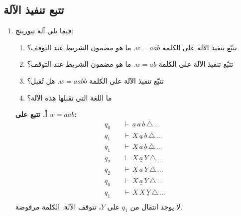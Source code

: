 \documentclass[14pt]{extarticle}
\begin{document}
\begin{enumerate}[itemsep=4em]
\section{تتبع تنفيذ الآلة}

\ifwithsols
\begin{enumerate}[itemsep=4em]
\else
\begin{enumerate}[itemsep=2em]
\fi

\item
فيما يلي آلة تيورينج:

\begin{center}
\end{center}

\begin{enumerate}
    \item تتبّع تنفيذ الآلة على الكلمة $w = aab$. ما هو مضمون الشريط عند التوقف؟
    \item تتبّع تنفيذ الآلة على الكلمة $w = ab$. ما هو مضمون الشريط عند التوقف؟
    \item تتبّع تنفيذ الآلة على الكلمة $w = aabb$. هل تُقبل؟
    \item ما اللغة التي تقبلها هذه الآلة؟
\end{enumerate}

\ifwithsols
\begin{boxSolution}

\textbf{أ. تتبع على $w = aab$:}
\begin{align*}
q_0 \quad &\vdash \, \underline{a} \, a \, b \, \triangle \, \ldots \\
q_1 \quad &\vdash \, X \, \underline{a} \, b \, \triangle \, \ldots \\
q_1 \quad &\vdash \, X \, a \, \underline{b} \, \triangle \, \ldots \\
q_2 \quad &\vdash \, X \, \underline{a} \, Y \, \triangle \, \ldots \\
q_2 \quad &\vdash \, \underline{X} \, a \, Y \, \triangle \, \ldots \\
q_0 \quad &\vdash \, X \, \underline{a} \, Y \, \triangle \, \ldots \\
q_1 \quad &\vdash \, X \, X \, \underline{Y} \, \triangle \, \ldots \\
\end{align*}
لا يوجد انتقال من $q_1$ على $Y$، تتوقف الآلة. الكلمة مرفوضة.


\end{boxSolution}
\end{enumerate}
\end{enumerate}
\end{enumerate}
\end{document}
